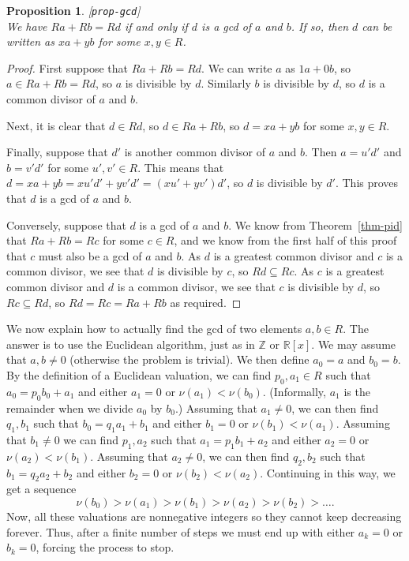 \documentclass{amsart}
\newcommand{\lbl}[1]{\label{#1}\textup{[\texttt{#1}]}\ \\}
\newcommand{\lbl}{\label}
\newcommand{\R}         {{\mathbb{R}}}
\newcommand{\Z}         {{\mathbb{Z}}}
\newcommand{\sse}       {\subseteq}
\renewcommand{\:}{\colon}
\newtheorem{proposition}[theorem]{Proposition}
\theoremstyle{definition}
\begin{document}
\begin{proposition}\lbl{prop-gcd}
 We have $Ra+Rb=Rd$ if and only if $d$ is a gcd of $a$ and $b$.  If
 so, then $d$ can be written as $xa+yb$ for some $x,y\in R$.
\end{proposition}
\begin{proof}
 First suppose that $Ra+Rb=Rd$.  We can write $a$ as $1a+0b$, so
 $a\in Ra+Rb=Rd$, so $a$ is divisible by $d$.  Similarly $b$ is
 divisible by $d$, so $d$ is a common divisor of $a$ and $b$.

 Next, it is clear that $d\in Rd$, so $d\in Ra+Rb$, so $d=xa+yb$ for
 some $x,y\in R$.

 Finally, suppose that $d'$ is another common divisor of $a$ and $b$.
 Then $a=u'd'$ and $b=v'd'$ for some $u',v'\in R$.  This means that
 $d=xa+yb=xu'd'+yv'd'=(xu'+yv')d'$, so $d$ is divisible by $d'$.  This
 proves that $d$ is a gcd of $a$ and $b$.

 Conversely, suppose that $d$ is a gcd of $a$ and $b$.  We know from
 Theorem~\ref{thm-pid} that $Ra+Rb=Rc$ for some $c\in R$, and we know
 from the first half of this proof that $c$ must also be a gcd of $a$
 and $b$.  As $d$ is a greatest common divisor and $c$ is a common
 divisor, we see that $d$ is divisible by $c$, so $Rd\sse Rc$.  As $c$
 is a greatest common divisor and $d$ is a common divisor, we see that
 $c$ is divisible by $d$, so $Rc\sse Rd$, so $Rd=Rc=Ra+Rb$ as
 required.
\end{proof}

We now explain how to actually find the gcd of two elements $a,b\in
R$.  The answer is to use the Euclidean algorithm, just as in $\Z$ or
$\R[x]$.  We may assume that $a,b\neq 0$ (otherwise the problem is
trivial).  We then define $a_0=a$ and $b_0=b$.  By the definition of a
Euclidean valuation, we can find $p_0,a_1\in R$ such that
$a_0=p_0b_0+a_1$ and either $a_1=0$ or $\nu(a_1)<\nu(b_0)$.
(Informally, $a_1$ is the remainder when we divide $a_0$ by $b_0$.)
Assuming that $a_1\neq 0$, we can then find $q_1,b_1$ such that
$b_0=q_1a_1+b_1$ and either $b_1=0$ or $\nu(b_1)<\nu(a_1)$.  Assuming
that $b_1\neq 0$ we can find $p_1,a_2$ such that $a_1=p_1b_1+a_2$ and
either $a_2=0$ or $\nu(a_2)<\nu(b_1)$.  Assuming that $a_2\neq 0$, we
can then find $q_2,b_2$ such that $b_1=q_2a_2+b_2$ and either $b_2=0$
or $\nu(b_2)<\nu(a_2)$.  Continuing in this way, we get a sequence
\[ \nu(b_0)>\nu(a_1)>\nu(b_1)>\nu(a_2)>\nu(b_2)> \ldots.  \]
Now, all these valuations are nonnegative integers so they cannot keep
decreasing forever.  Thus, after a finite number of steps we must end
up with either $a_k=0$ or $b_k=0$, forcing the process to stop.
\end{document}
